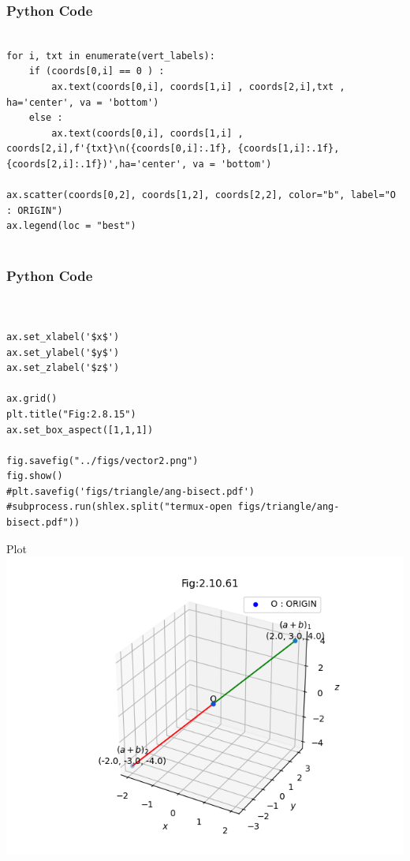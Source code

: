 \documentclass{beamer}
\begin{document}
\begin{frame}[fragile]
    \frametitle{Python Code }
    \begin{lstlisting}

for i, txt in enumerate(vert_labels):
    if (coords[0,i] == 0 ) :
        ax.text(coords[0,i], coords[1,i] , coords[2,i],txt , ha='center', va = 'bottom')
    else :
        ax.text(coords[0,i], coords[1,i] , coords[2,i],f'{txt}\n({coords[0,i]:.1f}, {coords[1,i]:.1f}, {coords[2,i]:.1f})',ha='center', va = 'bottom')

ax.scatter(coords[0,2], coords[1,2], coords[2,2], color="b", label="O : ORIGIN")
ax.legend(loc = "best")


    \end{lstlisting}
\end{frame}
\begin{frame}[fragile]
    \frametitle{Python Code }
    \begin{lstlisting}

    
ax.set_xlabel('$x$')
ax.set_ylabel('$y$')
ax.set_zlabel('$z$')

ax.grid()
plt.title("Fig:2.8.15")
ax.set_box_aspect([1,1,1])

fig.savefig("../figs/vector2.png")
fig.show()
#plt.savefig('figs/triangle/ang-bisect.pdf')
#subprocess.run(shlex.split("termux-open figs/triangle/ang-bisect.pdf"))

    \end{lstlisting}
\end{frame}


\begin{frame}{Plot}
    \centering
    \includegraphics[width=\columnwidth, height=0.8\textheight, keepaspectratio]{figs/vector1.png}   
\end{frame}
\end{document}

